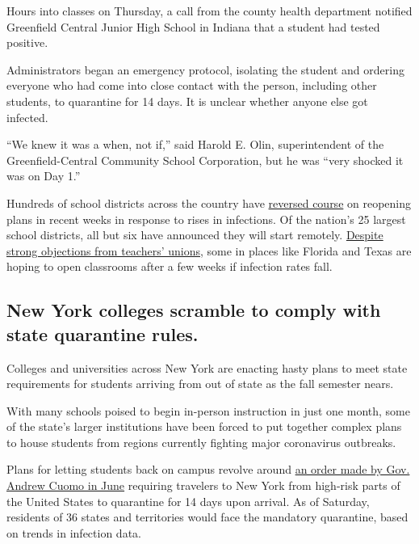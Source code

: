 Hours into classes on Thursday, a call from the county health department
notified Greenfield Central Junior High School in Indiana that a student
had tested positive.

Administrators began an emergency protocol, isolating the student and
ordering everyone who had come into close contact with the person,
including other students, to quarantine for 14 days. It is unclear
whether anyone else got infected.

``We knew it was a when, not if,'' said Harold E. Olin, superintendent
of the Greenfield-Central Community School Corporation, but he was
``very shocked it was on Day 1.''

Hundreds of school districts across the country have
\href{https://www.nytimes.com/2020/07/13/us/lausd-san-diego-school-reopening.html}{reversed
course} on reopening plans in recent weeks in response to rises in
infections. Of the nation's 25 largest school districts, all but six
have announced they will start remotely.
\href{https://www.nytimes.com/2020/07/29/us/teacher-union-school-reopening-coronavirus.html}{Despite
strong objections from teachers' unions}, some in places like Florida
and Texas are hoping to open classrooms after a few weeks if infection
rates fall.

\hypertarget{new-york-colleges-scramble-to-comply-with-state-quarantine-rules}{%
\subsection{New York colleges scramble to comply with state quarantine
rules.}\label{new-york-colleges-scramble-to-comply-with-state-quarantine-rules}}

Colleges and universities across New York are enacting hasty plans to
meet state requirements for students arriving from out of state as the
fall semester nears.

With many schools poised to begin in-person instruction in just one
month, some of the state's larger institutions have been forced to put
together complex plans to house students from regions currently fighting
major coronavirus outbreaks.

Plans for letting students back on campus revolve around
\href{https://www.nytimes.com/2020/06/24/nyregion/ny-coronavirus-states-quarantine.html}{an
order made by Gov. Andrew Cuomo in June} requiring travelers to New York
from high-risk parts of the United States to quarantine for 14 days upon
arrival. As of Saturday, residents of 36 states and territories would
face the mandatory quarantine, based on trends in infection data.

